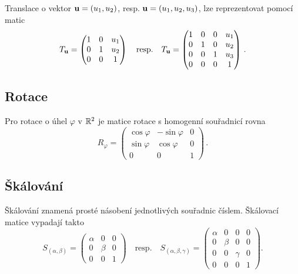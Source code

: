 Translace o vektor $\mathbf{u}  = (u_1, u_2)$, resp. $\mathbf{u}  = (u_1, u_2, u_3)$, lze reprezentovat pomocí matic
\[ T_{\mathbf{u} } =
\begin{pmatrix}
	1 & 0 & u_1 \\
	0 & 1 & u_2 \\
	0 & 0 & 1
\end{pmatrix}
\quad \text{resp.} \quad
T_{\mathbf{u} } =
\begin{pmatrix}
	1 & 0 & 0 & u_1 \\
	0 & 1 & 0 & u_2 \\
	0 & 0 & 1 & u_3 \\
	0 & 0 & 0 & 1
\end{pmatrix}\,. \]

\subsection*{Rotace}

Pro rotace o úhel $\varphi$ v $\mathbb{R}^2$ je matice rotace s homogenní souřadnicí rovna
\[ R_\varphi =
\begin{pmatrix}
	\cos\varphi &-\sin\varphi & 0\\
	\sin\varphi & \cos\varphi  & 0 \\
	0 & 0 & 1
\end{pmatrix}\,. \]

\subsection*{Škálování}

Škálování znamená prosté násobení jednotlivých souřadnic číslem. Škálovací matice vypadají takto
\[ S_{(\alpha, \beta)} =
\begin{pmatrix}
	\alpha & 0 & 0 \\
	0 & \beta & 0 \\
	0 & 0 & 1
\end{pmatrix}
\quad \text{resp.} \quad
S_{(\alpha, \beta, \gamma)} =
\begin{pmatrix}
	\alpha & 0 & 0 & 0 \\
	0 & \beta & 0 & 0 \\
	0 & 0 & \gamma & 0 \\
	0 & 0 & 0 & 1
\end{pmatrix}. \]


\pagebreak